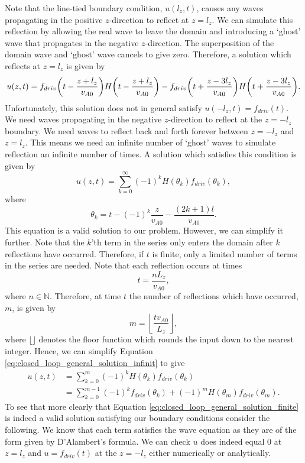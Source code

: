 Note that the line-tied boundary condition, $u(l_z,t)$, causes any waves propagating in the positive $z$-direction to reflect at $z=l_z$. We can simulate this reflection by allowing the real wave to leave the domain and introducing a `ghost' wave that propagates in the negative $z$-direction. The superposition of the domain wave and `ghost' wave cancels to give zero. Therefore, a solution which reflects at $z=l_z$ is given by
\[u(z,t) = f_{driv}\qty(t - \frac{z+l_z}{v_{A0}})H\qty(t - \frac{z+l_z}{v_{A0}}) - f_{driv}\qty(t + \frac{z-3l_z}{v_{A0}})H\qty(t + \frac{z-3l_z}{v_{A0}}).\]
Unfortunately, this solution does not in general satisfy $u(-l_z,t)=f_{driv}(t)$. We need waves propagating in the negative $z$-direction to reflect at the $z=-l_z$ boundary. We need waves to reflect back and forth forever between $z=-l_z$ and $z=l_z$. This means we need an infinite number of `ghost' waves to simulate reflection an infinite number of times. A solution which satisfies this condition is given by
\begin{equation}
    \label{eq:closed_loop_general_solution_infinit}
    u(z,t) = \sum_{k=0}^\infty(-1)^kH(\theta_k)f_{driv}(\theta_k),
\end{equation}
where
\begin{equation}
    \label{eq:theta_k}
    \theta_k=t-(-1)^k\frac{z}{v_{A0}}-\frac{(2k+1)l}{v_{A0}}.
\end{equation}
This equation is a valid solution to our problem. However, we can simplify it further. Note that the $k$'th term in the series only enters the domain after $k$ reflections have occurred. Therefore, if $t$ is finite, only a limited number of terms in the series are needed. Note that each reflection occurs at times
\begin{equation}
    t = \frac{n L_z}{v_{A0}},
\end{equation}
where $n\in\mathds{N}$. Therefore, at time $t$ the number of reflections which have occurred, $m$, is given by
\begin{equation}
    \label{eq:m}
    m = \left\lfloor\frac{t v_{A0}}{L_z}\right\rfloor,
\end{equation}
where $\lfloor \rfloor$ denotes the floor function which rounds the input down to the nearest integer. Hence, we can simplify Equation \eqref{eq:closed_loop_general_solution_infinit} to give
\begin{equation}
    \label{eq:closed_loop_general_solution_finite}
    \begin{aligned}
    u(z,t) &= \sum_{k=0}^m(-1)^kH(\theta_k)f_{driv}(\theta_k) \\
    &= \sum_{k=0}^{m-1}(-1)^kf_{driv}(\theta_k) + (-1)^mH(\theta_m)f_{driv}(\theta_m).
    \end{aligned}
\end{equation}
To see that more clearly that Equation \eqref{eq:closed_loop_general_solution_finite} is indeed a valid solution satisfying our boundary conditions consider the following. We know that each term satisfies the wave equation as they are of the form given by D'Alambert's formula. We can check $u$ does indeed equal 0 at $z=l_z$ and $u=f_{driv}(t)$ at the $z=-l_z$ either numerically or analytically.

